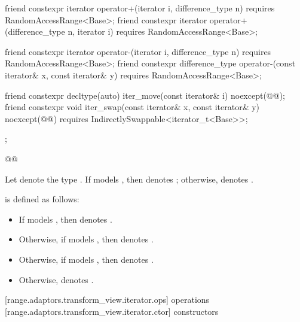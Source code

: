 {\begin{codeblock}
{{    friend constexpr iterator operator+(iterator i, difference_type n)
      requires RandomAccessRange<Base>;
    friend constexpr iterator operator+(difference_type n, iterator i)
      requires RandomAccessRange<Base>;

    friend constexpr iterator operator-(iterator i, difference_type n)
      requires RandomAccessRange<Base>;
    friend constexpr difference_type operator-(const iterator& x, const iterator& y)
      requires RandomAccessRange<Base>;

    friend constexpr decltype(auto) iter_move(const iterator& i)
      noexcept(@\oldtxt{\seebelow}@);
    friend constexpr void iter_swap(const iterator& x, const iterator& y)
      noexcept(@\oldtxt{\seebelow}@)
      requires IndirectlySwappable<iterator_t<Base>>;
  };
}@\oldtxt{\}}@
\end{codeblock}

{\color{newclr}
\pnum
Let  denote the type
. If 
models , then
 denotes ; otherwise,
 denotes .

\pnum
{} is defined as follows:
\begin{itemize}
\item If  models , then
 denotes .

\item Otherwise, if  models , then
 denotes .

\item Otherwise, if  models , then
 denotes .

\item Otherwise,  denotes .
\end{itemize}
} %

[range.adaptors.transform_view.iterator.ops]{ operations}
[range.adaptors.transform_view.iterator.ctor]{ constructors}

}
